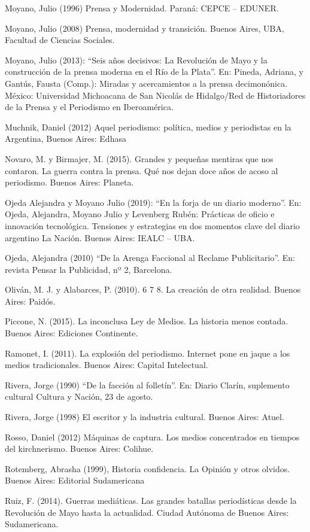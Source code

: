 Moyano, Julio (1996) Prensa y Modernidad. Paraná: CEPCE -- EDUNER.

Moyano, Julio (2008) Prensa, modernidad y transición. Buenos Aires, UBA, Facultad de Ciencias Sociales.

Moyano, Julio (2013): ``Seis años decisivos: La Revolución de Mayo y la construcción de la prensa moderna en el Río de la Plata''. En: Pineda, Adriana, y Gantús, Fausta (Comp.): Miradas y acercamientos a la prensa decimonónica. México: Universidad Michoacana de San Nicolás de Hidalgo/Red de Historiadores de la Prensa y el Periodismo en Iberoamérica.

Muchnik, Daniel (2012) Aquel periodismo: política, medios y periodistas en la Argentina, Buenos Aires: Edhasa

Novaro, M. y Birmajer, M. (2015). Grandes y pequeñas mentiras que nos contaron. La guerra contra la prensa. Qué nos dejan doce años de acoso al periodismo. Buenos Aires: Planeta.

Ojeda Alejandra y Moyano Julio (2019): ``En la forja de un diario moderno''. En: Ojeda, Alejandra, Moyano Julio y Levenberg Rubén: Prácticas de oficio e innovación tecnológica. Tensiones y estrategias en dos momentos clave del diario argentino La Nación. Buenos Aires: IEALC -- UBA.

Ojeda, Alejandra (2010) ``De la Arenga Faccional al Reclame Publicitario''. En: revista Pensar la Publicidad, nº 2, Barcelona.

Oliván, M. J. y Alabarces, P. (2010). 6 7 8. La creación de otra realidad. Buenos Aires: Paidós.

Piccone, N. (2015). La inconclusa Ley de Medios. La historia menos contada. Buenos Aires: Ediciones Continente.

Ramonet, I. (2011). La explosión del periodismo. Internet pone en jaque a los medios tradicionales. Buenos Aires: Capital Intelectual.

Rivera, Jorge (1990) ``De la facción al folletín''. En: Diario Clarín, suplemento cultural Cultura y Nación, 23 de agosto.

Rivera, Jorge (1998) El escritor y la industria cultural. Buenos Aires: Atuel.

Rosso, Daniel (2012) Máquinas de captura. Los medios concentrados en tiempos del kirchnerismo. Buenos Aires: Colihue.

Rotemberg, Abrasha (1999), Historia confidencia. La Opinión y otros olvidos. Buenos Aires: Editorial Sudamericana

Ruiz, F. (2014). Guerras mediáticas. Las grandes batallas periodísticas desde la Revolución de Mayo hasta la actualidad. Ciudad Autónoma de Buenos Aires: Sudamericana.

